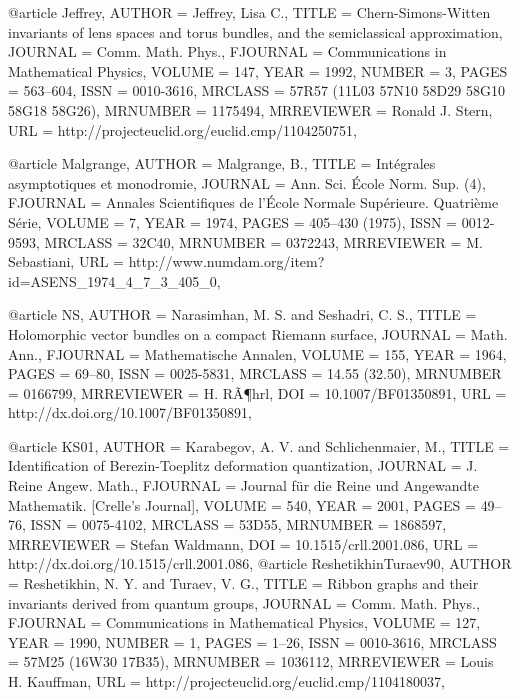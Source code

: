 @article {Jeffrey,
    AUTHOR = {Jeffrey, Lisa C.},
     TITLE = {Chern-{S}imons-{W}itten invariants of lens spaces and torus
              bundles, and the semiclassical approximation},
   JOURNAL = {Comm. Math. Phys.},
  FJOURNAL = {Communications in Mathematical Physics},
    VOLUME = {147},
      YEAR = {1992},
    NUMBER = {3},
     PAGES = {563--604},
      ISSN = {0010-3616},
   MRCLASS = {57R57 (11L03 57N10 58D29 58G10 58G18 58G26)},
  MRNUMBER = {1175494},
MRREVIEWER = {Ronald J. Stern},
       URL = {http://projecteuclid.org/euclid.cmp/1104250751},
}

@article {Malgrange,
    AUTHOR = {Malgrange, B.},
     TITLE = {Int\'egrales asymptotiques et monodromie},
   JOURNAL = {Ann. Sci. \'Ecole Norm. Sup. (4)},
  FJOURNAL = {Annales Scientifiques de l'\'Ecole Normale Sup\'erieure. Quatri\`eme
              S\'erie},
    VOLUME = {7},
      YEAR = {1974},
     PAGES = {405--430 (1975)},
      ISSN = {0012-9593},
   MRCLASS = {32C40},
  MRNUMBER = {0372243},
MRREVIEWER = {M. Sebastiani},
       URL = {http://www.numdam.org/item?id=ASENS_1974_4_7_3_405_0},
}

@article {NS,
    AUTHOR = {Narasimhan, M. S. and Seshadri, C. S.},
     TITLE = {Holomorphic vector bundles on a compact {R}iemann surface},
   JOURNAL = {Math. Ann.},
  FJOURNAL = {Mathematische Annalen},
    VOLUME = {155},
      YEAR = {1964},
     PAGES = {69--80},
      ISSN = {0025-5831},
   MRCLASS = {14.55 (32.50)},
  MRNUMBER = {0166799},
MRREVIEWER = {H. R\~A\P hrl},
       DOI = {10.1007/BF01350891},
       URL = {http://dx.doi.org/10.1007/BF01350891},
}


@article {KS01,
    AUTHOR = {Karabegov, A. V. and Schlichenmaier, M.},
     TITLE = {Identification of {B}erezin-{T}oeplitz deformation
              quantization},
   JOURNAL = {J. Reine Angew. Math.},
  FJOURNAL = {Journal f\"ur die Reine und Angewandte Mathematik. [Crelle's
              Journal]},
    VOLUME = {540},
      YEAR = {2001},
     PAGES = {49--76},
      ISSN = {0075-4102},
   MRCLASS = {53D55},
  MRNUMBER = {1868597},
MRREVIEWER = {Stefan Waldmann},
       DOI = {10.1515/crll.2001.086},
       URL = {http://dx.doi.org/10.1515/crll.2001.086},
}
@article {ReshetikhinTuraev90,
    AUTHOR = {Reshetikhin, N. Y. and Turaev, V. G.},
     TITLE = {Ribbon graphs and their invariants derived from quantum
              groups},
   JOURNAL = {Comm. Math. Phys.},
  FJOURNAL = {Communications in Mathematical Physics},
    VOLUME = {127},
      YEAR = {1990},
    NUMBER = {1},
     PAGES = {1--26},
      ISSN = {0010-3616},
   MRCLASS = {57M25 (16W30 17B35)},
  MRNUMBER = {1036112},
MRREVIEWER = {Louis H. Kauffman},
       URL = {http://projecteuclid.org/euclid.cmp/1104180037},
}


